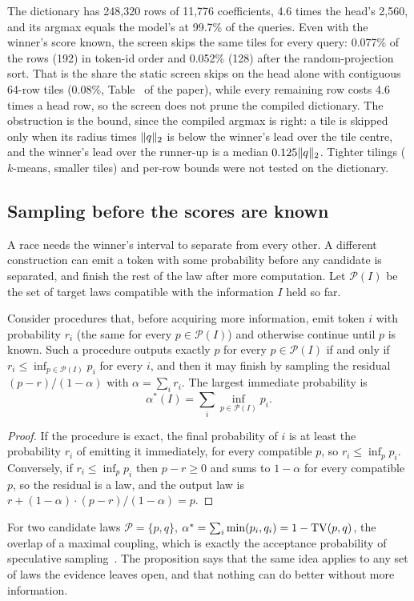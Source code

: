 The dictionary has 248,320 rows of 11,776 coefficients, 4.6 times the head's 2,560, and its argmax equals the model's at 99.7\% of the queries. Even with the winner's score known, the screen skips the same tiles for every query: 0.077\% of the rows (192) in token-id order and 0.052\% (128) after the random-projection sort. That is the share the static screen skips on the head alone with contiguous 64-row tiles (0.08\%, Table~ of the paper), while every remaining row costs 4.6 times a head row, so the screen does not prune the compiled dictionary. The obstruction is the bound, since the compiled argmax is right: a tile is skipped only when its radius times $\lVert q\rVert_2$ is below the winner's lead over the tile centre, and the winner's lead over the runner-up is a median $0.125\lVert q\rVert_2$. Tighter tilings ($k$-means, smaller tiles) and per-row bounds were not tested on the dictionary.

\subsection{Sampling before the scores are known}\label{app:commonmass}\label{sec:commonmass}
A race needs the winner's interval to separate from every other. A different construction can emit a token with some probability before any candidate is separated, and finish the rest of the law after more computation. Let $\mathcal P(I)$ be the set of target laws compatible with the information $I$ held so far.

\begin{proposition}\label{prop:commonmass}
Consider procedures that, before acquiring more information, emit token $i$ with probability $r_i$ (the same for every $p\in\mathcal P(I)$) and otherwise continue until $p$ is known. Such a procedure outputs exactly $p$ for every $p\in\mathcal P(I)$ if and only if $r_i\le\inf_{p\in\mathcal P(I)}p_i$ for every $i$, and then it may finish by sampling the residual $(p-r)/(1-\alpha)$ with $\alpha=\sum_ir_i$. The largest immediate probability is
\[\alpha^\ast(I)=\sum_i\inf_{p\in\mathcal P(I)}p_i.\]
\end{proposition}
\begin{proof}
If the procedure is exact, the final probability of $i$ is at least the probability $r_i$ of emitting it immediately, for every compatible $p$, so $r_i\le\inf_pp_i$. Conversely, if $r_i\le\inf_pp_i$ then $p-r\ge0$ and sums to $1-\alpha$ for every compatible $p$, so the residual is a law, and the output law is $r+(1-\alpha)\cdot(p-r)/(1-\alpha)=p$.
\end{proof}
For two candidate laws $\mathcal P=\{p,q\}$, $\alpha^\ast=\sum_i\min(p_i,q_i)=1-\operatorname{TV}(p,q)$, the overlap of a maximal coupling, which is exactly the acceptance probability of speculative sampling~\cite{specdecode,chen2023specsampling}. The proposition says that the same idea applies to any set of laws the evidence leaves open, and that nothing can do better without more information.

